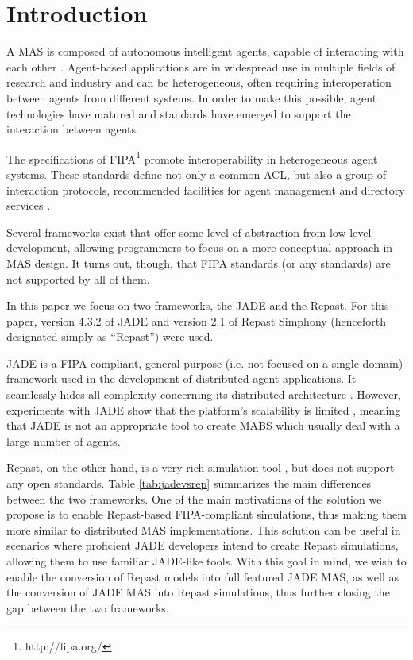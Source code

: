 \section{Introduction} %
\label{sec:introduction}

A \gls{MAS} is composed of autonomous intelligent agents, capable of interacting with each other \cite{wooldridge2008introduction}.
Agent-based applications are in widespread use in multiple fields of research and industry and can be heterogeneous, often requiring interoperation between agents from different systems.
In order to make this possible, agent technologies have matured and standards have emerged to support the interaction between agents.

The specifications of \gls{FIPA}\footnote{http://fipa.org/} promote interoperability in heterogeneous agent systems.
These standards define not only a common \gls{ACL}, but also a group of interaction protocols, recommended facilities for agent management and directory services \cite{o1998fipa}.

Several frameworks exist \cite{survey,survey2} that offer some level of abstraction from low level development, allowing programmers to focus on a more conceptual approach in \gls{MAS} design.
It turns out, though, that \gls{FIPA} standards (or any standards) are not supported by all of them.

In this paper we focus on two frameworks, the \gls{JADE} and the \gls{Repast}. For this paper, version 4.3.2 of JADE and version 2.1 of Repast Simphony (henceforth designated simply as ``Repast'') were used.

\gls{JADE} is a \gls{FIPA}-compliant, general-purpose (i.e. not focused on a single domain) framework used in the development of distributed agent applications.
It seamlessly hides all complexity concerning its distributed architecture \cite{bellifemine2003JADE}.
However, experiments with \gls{JADE} show that the platform's scalability is limited \cite{mengistu2008scalability}, meaning that \gls{JADE} is not an appropriate tool to create MABS which usually deal with a large number of agents.

Repast, on the other hand, is a very rich simulation tool \cite{repSimph}, but does not support any open standards. Table \ref{tab:jadevsrep} summarizes the main differences between the two frameworks. One of the main motivations of the solution we propose is to enable Repast-based \gls{FIPA}-compliant simulations, thus making them more similar to distributed MAS implementations. This solution can be useful in scenarios where proficient JADE developers intend to create Repast simulations, allowing them to use familiar JADE-like tools. 
With this goal in mind, we wish to enable the conversion of Repast models into full featured \gls{JADE} MAS, as well as the conversion of \gls{JADE} MAS into Repast simulations, thus further closing the gap between the two frameworks.

